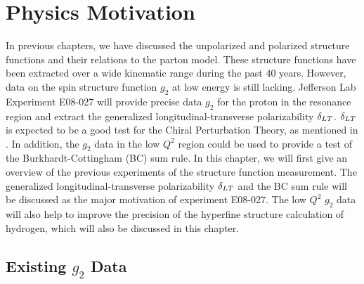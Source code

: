 
\chapter{Physics Motivation}
\label{C4}

In previous chapters, we have discussed the unpolarized and polarized structure functions and their relations to the parton model. These structure functions have been extracted over a wide kinematic range during the past 40 years. However, data on the spin structure function $g_2$ at low energy is still lacking. Jefferson Lab Experiment E08-027 will provide precise data $g_2$ for the proton in the resonance region and extract the generalized longitudinal-transverse polarizability $\delta_{LT}$. $\delta_{LT}$ is expected to be a good test for the Chiral Perturbation Theory, as mentioned in . In addition, the $g_2$ data in the low $Q^2$ region could be used to provide a test of the Burkhardt-Cottingham (BC) sum rule. In this chapter, we will first give an overview of the previous experiments of the structure function measurement. The generalized longitudinal-transverse polarizability $\delta_{LT}$ and the BC sum rule will be discussed as the major motivation of experiment E08-027. The low $Q^2$ $g_2$ data will also help to improve the precision of the hyperfine structure calculation of hydrogen, which will also be discussed in this chapter.

\section{\texorpdfstring{Existing $g_2$ Data}{Existing g2 Data}}
\label{C4S1}

